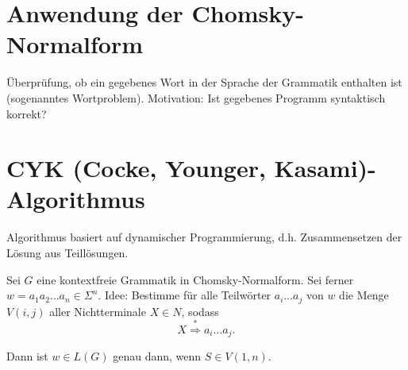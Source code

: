 \documentclass[11pt]{article} %
\theoremstyle{definition}
\begin{document}
\section{Anwendung der Chomsky-Normalform}

Überprüfung, ob ein gegebenes Wort in der Sprache der Grammatik enthalten ist (sogenanntes Wortproblem). Motivation: Ist gegebenes Programm syntaktisch korrekt?

\section{CYK (Cocke, Younger, Kasami)-Algorithmus}

Algorithmus basiert auf dynamischer Programmierung, d.h. Zusammensetzen der Lösung aus Teillösungen.

Sei $G$ eine kontextfreie Grammatik in Chomsky-Normalform. Sei ferner $w = a_1a_2\dots a_n \in \Sigma^n$. Idee: Bestimme für alle Teilwörter $a_i\dots a_j$ von $w$ die Menge $V(i,j)$ aller Nichtterminale $X \in N$, sodass
\[
X \overset{*}{\Rightarrow} a_i\dots a_j.
\]

Dann ist $w \in L(G)$ genau dann, wenn $S \in V(1, n)$.
\end{document}
